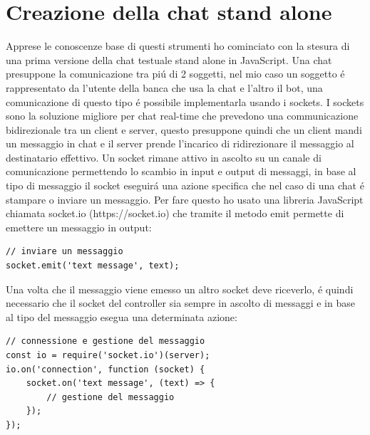 \section{Creazione della chat stand alone}
Apprese le conoscenze base di questi strumenti ho cominciato con la stesura di una prima versione della chat testuale stand alone in JavaScript. Una chat presuppone la comunicazione tra pi\'u di 2 soggetti, nel mio caso un soggetto \'e rappresentato da l'utente della banca che usa la chat e l'altro il bot, una comunicazione di questo tipo \'e possibile implementarla usando i sockets.
I sockets sono la soluzione migliore per chat real-time che prevedono una communicazione bidirezionale tra un client e server, questo presuppone quindi che un client mandi un messaggio in chat e il server prende l'incarico di ridirezionare il messaggio al destinatario effettivo. Un socket rimane attivo in ascolto su un canale di comunicazione permettendo lo scambio in input e output di messaggi, in base al tipo di messaggio il socket eseguir\'a una azione specifica che nel caso di una chat \'e stampare o inviare un messaggio. Per fare questo ho usato una libreria JavaScript chiamata socket.io (https://socket.io) che tramite il metodo emit permette di emettere un messaggio in output:
\begin{lstlisting}
// inviare un messaggio
socket.emit('text message', text);
\end{lstlisting} 
Una volta che il messaggio viene emesso un altro socket deve riceverlo, \'e quindi necessario che il socket del controller sia sempre in ascolto di messaggi e in base al tipo del messaggio esegua una determinata azione:
\begin{lstlisting}
// connessione e gestione del messaggio
const io = require('socket.io')(server);
io.on('connection', function (socket) {
    socket.on('text message', (text) => {
        // gestione del messaggio
    });
});
\end{lstlisting}
